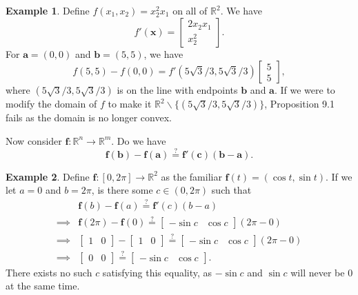 \documentclass{article}
\newcommand{\R}{\mathbb{R}}
\newcommand{\x}{\mathbf{x}}
\newcommand{\f}{\mathbf{f}}
\renewcommand{\b}{\mathbf{b}}
\renewcommand{\a}{\mathbf{a}}
\theoremstyle{definition}
\newtheorem{example}{Example}[section]
\begin{document}
\begin{example}
	Define $ f(x_1,x_2)=x_2^2x_1 $ on all of $ \R^2 $. We have $$ f'(\x) = \begin{bmatrix}
		2x_2x_1\\x_2^2
	\end{bmatrix}.$$ For $ \a = (0,0) $ and $  \b = (5,5) $, we have $$  f(5,5)-f(0,0)=f'\left(5\sqrt{3}/3,5\sqrt{3}/3\right)\begin{bmatrix}
5\\5
\end{bmatrix},$$ where $ (5\sqrt{3}/3,5\sqrt{3}/3) $ is on the line with endpoints $ \b $ and $ \a $.  If we were to modify the domain of $ f $ to make it $ \R^2 \backslash\{(5\sqrt{3}/3,5\sqrt{3}/3)\} $, Proposition 9.1 fails as the domain is no longer convex.
\end{example}

Now consider $ \f:\R^n\to\R^m $. Do we have 
$$\f(\mathbf b)-\f(\mathbf a)\stackrel{?}{=}\f'(\mathbf c)(\mathbf b - \mathbf a).$$ 
\begin{example}
	Define $ \f:[0,2\pi]\to\R^2 $ as the familiar $ \f(t)=(\cos t, \sin t) $. If we let $ a = 0 $ and $ b = 2\pi $, is there some $ c\in (0, 2\pi ) $ such that 
	\begin{align*}
		& \f( b)-\f( a)\stackrel{?}{=}\f'( c)( b -  a)\\
		\implies &\f( 2\pi)-\f(0)\stackrel{?}{=}\begin{bmatrix}
			-\sin c & \cos c
		\end{bmatrix}(2\pi - 0)\\ \implies &\begin{bmatrix}
		1 & 0
	\end{bmatrix}-\begin{bmatrix}
	1 & 0
\end{bmatrix}\stackrel{?}{=}\begin{bmatrix}
		-\sin c & \cos c
	\end{bmatrix}(2\pi - 0)\\  \implies &\begin{bmatrix}
	0 & 0 
\end{bmatrix} \stackrel{?}{=} \begin{bmatrix}
-\sin c & \cos c
\end{bmatrix}.
	\end{align*}
There exists no such $ c $ satisfying this equality, as $ -\sin c $ and $ \sin c $ will never be $ 0 $ at the same time. 
\end{example}
\end{document}
